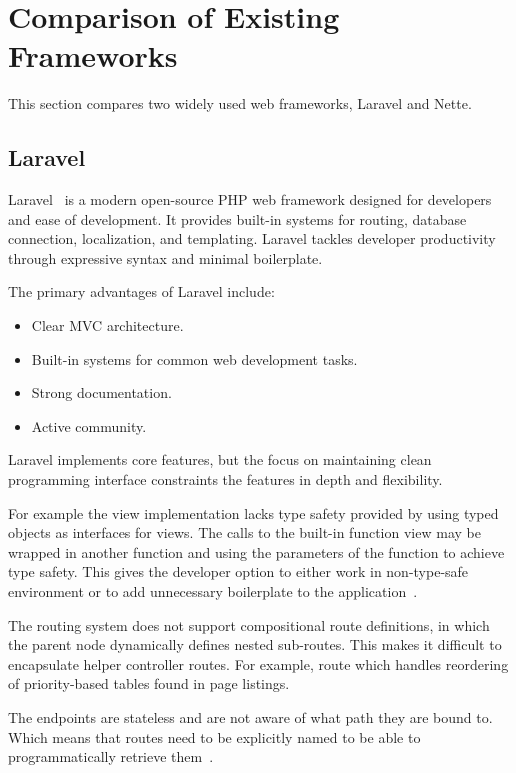 \section{Comparison of Existing Frameworks}\label{sec:comparison-of-existing-frameworks}
This section compares two widely used web frameworks, Laravel and Nette.

\subsection{Laravel}\label{subsec:laravel}
Laravel~\parencite{laravel} is a modern open-source PHP web framework designed for developers and ease of development.
It provides built-in systems for routing, database connection, localization, and templating.
Laravel tackles developer productivity through expressive syntax and minimal boilerplate.

The primary advantages of Laravel include:

\begin{itemize}
    \item Clear MVC architecture.
    \item Built-in systems for common web development tasks.
    \item Strong documentation.
    \item Active community.
\end{itemize}

Laravel implements core features, but the focus on maintaining clean programming interface constraints the features
in depth and flexibility.

For example the view implementation lacks type safety provided by using typed objects as interfaces for views.
The calls to the built-in function view may be wrapped in another function and using the parameters of the function to achieve type safety.
This gives the developer option to either work in non-type-safe environment or to add unnecessary boilerplate to the application~\parencite{laravel_view}.

The routing system does not support compositional route definitions, in which the parent node dynamically defines nested sub-routes.
This makes it difficult to encapsulate helper controller routes.
For example, route which handles reordering of priority-based tables found in page listings.

The endpoints are stateless and are not aware of what path they are bound to.
Which means that routes need to be explicitly named to be able to programmatically retrieve them~\parencite{laravel_routing}.

